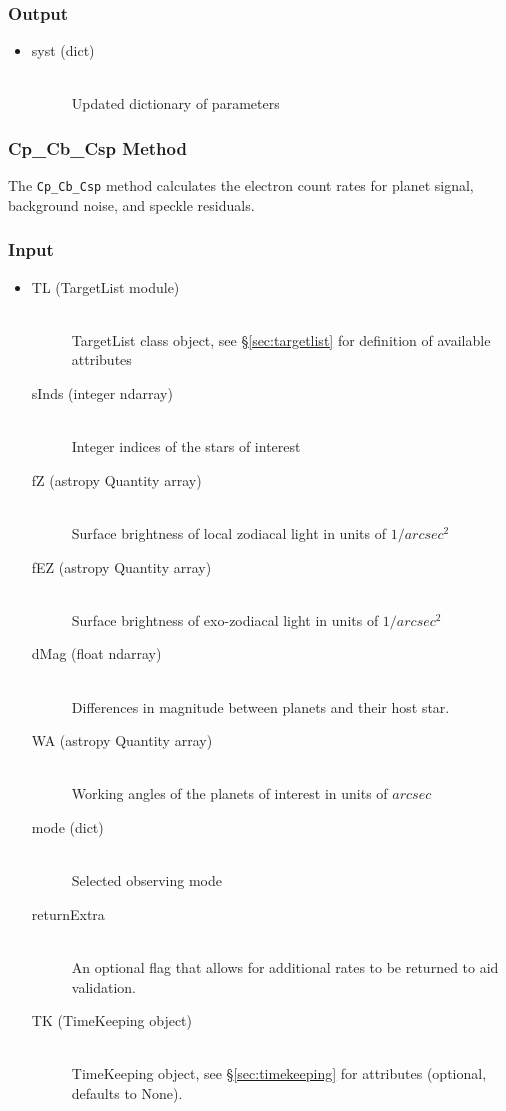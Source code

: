 \documentclass[cleanfoot]{asme2ej}
\begin{document}
\subsubsection*{Output}
\begin{itemize}
\item
\begin{description}
    \item[syst (dict)] \hfill \\ Updated dictionary of parameters
\end{description}
\end{itemize}

\subsubsection{Cp\_Cb\_Csp Method} \label{sec:CpCbCsptask}
The \verb+Cp_Cb_Csp+ method calculates the electron count rates for planet signal, background noise, and speckle residuals.
\subsubsection*{Input}
\begin{itemize}
\item 
    \begin{description}
    \item[TL (TargetList module)] \hfill \\ TargetList class object, see \S\ref{sec:targetlist} for definition of available attributes
    \item[sInds (integer ndarray)] \hfill \\ Integer indices of the stars of interest
    \item[fZ (astropy Quantity array)] \hfill \\ Surface brightness of local zodiacal light in units of $ 1/arcsec^2 $
    \item[fEZ (astropy Quantity array)] \hfill \\ Surface brightness of exo-zodiacal light in units of $ 1/arcsec^2 $
    \item[dMag (float ndarray)] \hfill \\ Differences in magnitude between planets and their host star.
    \item[WA (astropy Quantity array)] \hfill \\ Working angles of the planets of interest in units of $arcsec$
    \item[mode (dict)] \hfill \\ Selected observing mode
    \item[returnExtra] \hfill \\ An optional flag that allows for additional rates to be returned to aid validation.
     \item[TK (TimeKeeping object)] \hfill \\ TimeKeeping object, see \S\ref{sec:timekeeping} for attributes (optional, defaults to None).
\end{description}
\end{itemize}
\end{document}

